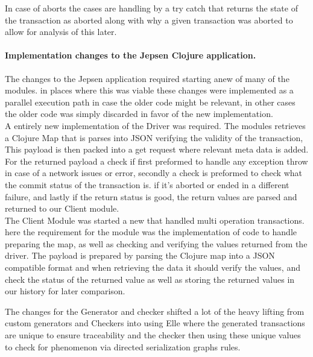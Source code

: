 \documentclass[a4paper,10pt,titlepage]{report}
\begin{document}
In case of aborts the cases are handling by a try catch that returns the state of the transaction as aborted along with why a given transaction was aborted to allow for analysis of this later.

\paragraph*{Implementation changes to the Jepsen Clojure application.}


The changes to the Jepsen application required starting anew of many of the modules. in places where this was viable these changes were implemented as a parallel execution path in case the older code might be relevant, in other cases the older code was simply discarded in favor of the new implementation.
\\
\vspace{5mm}
A entirely new implementation of the Driver was required. The modules retrieves a Clojure Map that is parses into JSON verifying the validity of the transaction, This payload is then packed into a get request where relevant meta data is added. For the returned payload a check if first preformed to handle any exception throw in case of a network issues or error, secondly a check is preformed to check what the commit status of the transaction is. if it's aborted or ended in a different failure, and lastly if the return status is good, the return values are parsed and returned to our Client module.
\\
\vspace{5mm}
The Client Module was started a new that handled multi operation transactions. here the requirement for the module was the  implementation of code to handle preparing the map,  as well as checking and verifying the values returned from the driver. The payload is prepared by parsing the Clojure map into a JSON compatible format and when retrieving the data it should verify the values, and check the status of the returned value as well as storing the returned values in our history for later comparison.
\\
\vspace{5mm}
    
The changes for the Generator and checker shifted a lot of the heavy lifting from custom generators and Checkers into using Elle where the generated transactions are unique to ensure traceability and the checker then using these unique values to check for phenomenon via directed serialization graphs rules.
\\
\vspace{5mm}
\end{document}
